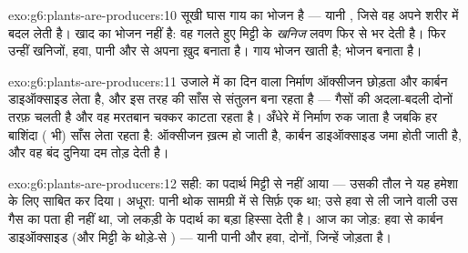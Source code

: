 \begin{solution}{exo:g6:plants-are-producers:10}
सूखी घास गाय का भोजन है --- यानी , जिसे वह अपने शरीर में
बदल लेती है। खाद  का भोजन नहीं है: वह गलते हुए मिट्टी के
\emph{खनिज} लवण फिर से भर देती है। फिर  उन्हीं खनिजों, हवा, पानी
और  से अपना  ख़ुद बनाता है। गाय भोजन खाती है; 
भोजन बनाता है।
\end{solution}

\begin{solution}{exo:g6:plants-are-producers:11}
उजाले में  का दिन वाला निर्माण ऑक्सीजन छोड़ता और कार्बन डाइऑक्साइड
लेता है, और इस तरह  की साँस से संतुलन बना रहता है --- गैसों की
अदला-बदली दोनों तरफ़ चलती है और वह मरतबान चक्कर काटता रहता है। अँधेरे
में निर्माण रुक जाता है जबकि हर बाशिंदा ( भी) साँस लेता रहता है:
ऑक्सीजन ख़त्म हो जाती है, कार्बन डाइऑक्साइड जमा होती जाती है, और वह
बंद दुनिया दम तोड़ देती है।
\end{solution}

\begin{solution}{exo:g6:plants-are-producers:12}
सही:  का पदार्थ मिट्टी से नहीं आया --- उसकी तौल ने यह हमेशा के लिए
साबित कर दिया। अधूरा: पानी थोक सामग्री में से सिर्फ़ एक था; उसे हवा से
ली जाने वाली उस गैस का पता ही नहीं था, जो लकड़ी के पदार्थ का बड़ा
हिस्सा देती है। आज का जोड़: हवा से कार्बन डाइऑक्साइड (और मिट्टी के
थोड़े-से ) --- यानी पानी और हवा, दोनों, जिन्हें  जोड़ता
है।
\end{solution}

